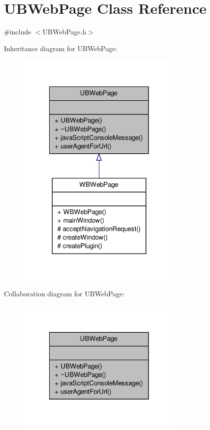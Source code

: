 \hypertarget{class_u_b_web_page}{\section{U\-B\-Web\-Page Class Reference}
\label{dd/d18/class_u_b_web_page}
}


{\ttfamily \#include $<$U\-B\-Web\-Page.\-h$>$}



Inheritance diagram for U\-B\-Web\-Page\-:
\nopagebreak
\begin{figure}[H]
\begin{center}
\leavevmode
\includegraphics[width=230pt]{d4/dee/class_u_b_web_page__inherit__graph}
\end{center}
\end{figure}


Collaboration diagram for U\-B\-Web\-Page\-:
\nopagebreak
\begin{figure}[H]
\begin{center}
\leavevmode
\includegraphics[width=230pt]{d5/d48/class_u_b_web_page__coll__graph}
\end{center}
\end{figure}
